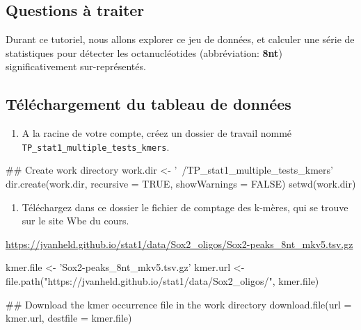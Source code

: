 \documentclass[]{article}
\newenvironment{Shaded}{\begin{snugshade}}{\end{snugshade}}
\newcommand{\KeywordTok}[1]{\textcolor[rgb]{0.94,0.87,0.69}{#1}}
\newcommand{\DataTypeTok}[1]{\textcolor[rgb]{0.87,0.87,0.75}{#1}}
\newcommand{\StringTok}[1]{\textcolor[rgb]{0.80,0.58,0.58}{#1}}
\newcommand{\OtherTok}[1]{\textcolor[rgb]{0.94,0.94,0.56}{#1}}
\newcommand{\NormalTok}[1]{\textcolor[rgb]{0.80,0.80,0.80}{#1}}
\providecommand{\tightlist}{%
  \setlength{\itemsep}{0pt}\setlength{\parskip}{0pt}}
\begin{document}
\subsection{Questions à traiter}\label{questions-a-traiter}

Durant ce tutoriel, nous allons explorer ce jeu de données, et calculer
une série de statistiques pour détecter les octanucléotides
(abbréviation: \textbf{8nt}) significativement sur-représentés.

\subsection{Téléchargement du tableau de
données}\label{telechargement-du-tableau-de-donnees}

\begin{enumerate}
\def\labelenumi{\arabic{enumi}.}
\tightlist
\item
  A la racine de votre compte, créez un dossier de travail nommé
  \texttt{TP\_stat1\_multiple\_tests\_kmers}.
\end{enumerate}

\begin{Shaded}
\begin{Highlighting}[]
\NormalTok{## Create work directory}
\NormalTok{work.dir <-}\StringTok{ '~/TP_stat1_multiple_tests_kmers'}
\KeywordTok{dir.create}\NormalTok{(work.dir, }\DataTypeTok{recursive =} \OtherTok{TRUE}\NormalTok{, }\DataTypeTok{showWarnings =} \OtherTok{FALSE}\NormalTok{)}
\KeywordTok{setwd}\NormalTok{(work.dir)}
\end{Highlighting}
\end{Shaded}

\begin{enumerate}
\def\labelenumi{\arabic{enumi}.}
\setcounter{enumi}{1}
\tightlist
\item
  Téléchargez dans ce dossier le fichier de comptage des k-mères, qui se
  trouve sur le site Wbe du cours.
\end{enumerate}

\url{https://jvanheld.github.io/stat1/data/Sox2_oligos/Sox2-peaks_8nt_mkv5.tsv.gz}

\begin{Shaded}
\begin{Highlighting}[]
\NormalTok{kmer.file <-}\StringTok{ 'Sox2-peaks_8nt_mkv5.tsv.gz'}
\NormalTok{kmer.url <-}\StringTok{ }\KeywordTok{file.path}\NormalTok{(}\StringTok{"https://jvanheld.github.io/stat1/data/Sox2_oligos/"}\NormalTok{, kmer.file)}


\NormalTok{## Download the kmer occurrence file in the work directory}
\KeywordTok{download.file}\NormalTok{(}\DataTypeTok{url =}\NormalTok{ kmer.url, }\DataTypeTok{destfile =}\NormalTok{ kmer.file)}
\end{Highlighting}
\end{Shaded}
\end{document}
